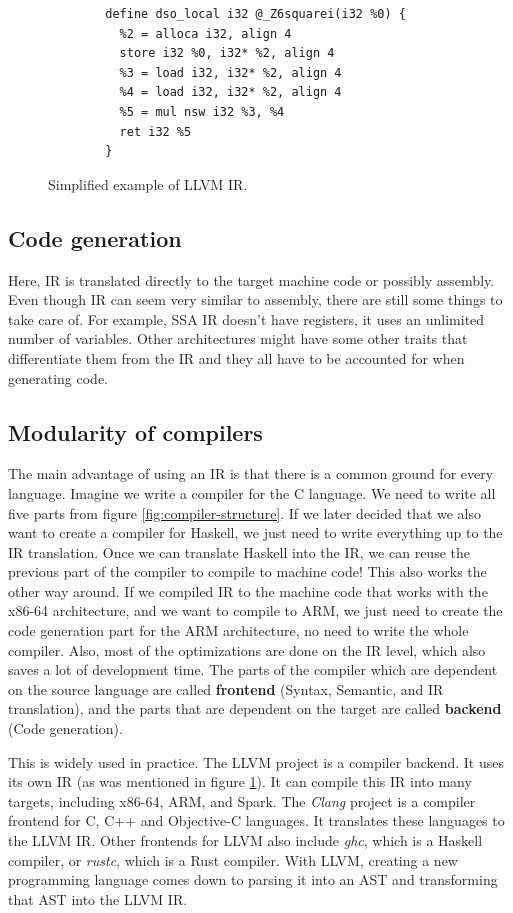 \begin{figure}\label{fig:llvm-ir-example}
    \begin{verbatim}
        define dso_local i32 @_Z6squarei(i32 %0) {
          %2 = alloca i32, align 4
          store i32 %0, i32* %2, align 4
          %3 = load i32, i32* %2, align 4
          %4 = load i32, i32* %2, align 4
          %5 = mul nsw i32 %3, %4
          ret i32 %5
        }
    \end{verbatim}
    \caption{Simplified example of LLVM IR.}
\end{figure}

\subsection{Code generation}
Here, IR is translated directly to the target machine code or possibly
assembly. Even though IR can seem very similar to assembly, there are still
some things to take care of. For example, SSA IR doesn't have registers, it
uses an unlimited number of variables. Other architectures might have some
other traits that differentiate them from the IR and they all have to be
accounted for when generating code.

\subsection{Modularity of compilers}
The main advantage of using an IR is that there is a common ground for every
language. Imagine we write a compiler for the C language. We need to write all
five parts from figure \ref{fig:compiler-structure}. If we later decided that
we also want to create a compiler for Haskell, we just need to write everything
up to the IR translation. Once we can translate Haskell into the IR, we can
reuse the previous part of the compiler to compile to machine code! This also
works the other way around. If we compiled IR to the machine code that works
with the x86-64 architecture, and we want to compile to ARM, we just need to
create the code generation part for the ARM architecture, no need to write the
whole compiler. Also, most of the optimizations are done on the IR level, which
also saves a lot of development time. The parts of the compiler which are
dependent on the source language are called \textbf{frontend} (Syntax,
Semantic, and IR translation), and the parts that are dependent on the target
are called \textbf{backend} (Code generation).

This is widely used in practice. The LLVM \cite{llvm} project is a compiler
backend. It uses its own IR (as was mentioned in figure
\ref{fig:llvm-ir-example}). It can compile this IR into many targets, including
x86-64, ARM, and Spark. The \textit{Clang} project is a compiler frontend for C,
C++ and Objective-C languages. It translates these languages to the LLVM IR.
Other frontends for LLVM also include \textit{ghc}, which is a Haskell
compiler, or \textit{rustc}, which is a Rust compiler. With LLVM, creating a
new programming language comes down to parsing it into an AST and transforming
that AST into the LLVM IR.

